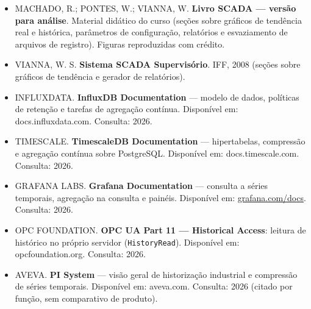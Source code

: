 \begin{itemize}
\tightlist
\item
  MACHADO, R.; PONTES, W.; VIANNA, W. \textbf{Livro SCADA --- versão para análise}. Material didático do curso (seções sobre gráficos de tendência real e histórica, parâmetros de configuração, relatórios e esvaziamento de arquivos de registro). Figuras reproduzidas com crédito.
\item
  VIANNA, W. S. \textbf{Sistema SCADA Supervisório}. IFF, 2008 (seções sobre gráficos de tendência e gerador de relatórios).
\item
  INFLUXDATA. \textbf{InfluxDB Documentation} --- modelo de dados, políticas de retenção e tarefas de agregação contínua. Disponível em: docs.influxdata.com. Consulta: 2026.
\item
  TIMESCALE. \textbf{TimescaleDB Documentation} --- hipertabelas, compressão e agregação contínua sobre PostgreSQL. Disponível em: docs.timescale.com. Consulta: 2026.
\item
  GRAFANA LABS. \textbf{Grafana Documentation} --- consulta a séries temporais, agregação na consulta e painéis. Disponível em: \url{grafana.com/docs}. Consulta: 2026.
\item
  OPC FOUNDATION. \textbf{OPC UA Part 11 --- Historical Access}: leitura de histórico no próprio servidor (\passthrough{\lstinline!HistoryRead!}). Disponível em: opcfoundation.org. Consulta: 2026.
\item
  AVEVA. \textbf{PI System} --- visão geral de historização industrial e compressão de séries temporais. Disponível em: aveva.com. Consulta: 2026 (citado por função, sem comparativo de produto).
\end{itemize}
